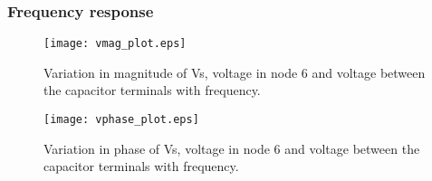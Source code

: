 \subsubsection{Frequency response}  %



\begin{figure}[h] \centering
\texttt{[image: vmag\_plot.eps]}
\caption{Variation in magnitude of Vs, voltage in node 6 and voltage between the capacitor terminals with frequency.}
\label{fig:magnitude}
\end{figure}


\begin{figure}[h] \centering
\texttt{[image: vphase\_plot.eps]}
\caption{Variation in phase of Vs, voltage in node 6 and voltage between the capacitor terminals with frequency.}
\label{fig:phase}
\end{figure}






